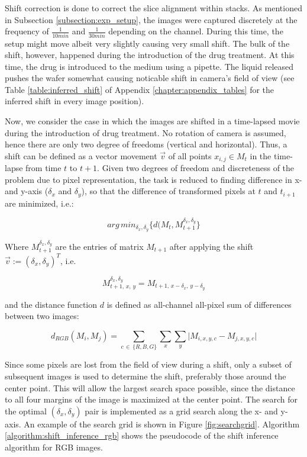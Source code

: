 \documentclass[pdftex,12pt,a4paper]{report}
\begin{document}
Shift correction is done to correct the slice alignment within stacks. As mentioned in Subsection \ref{subsection:exp_setup}, the images were captured discretely at the frequency of $\frac{1}{10 min}$ and $\frac{1}{30 min}$ depending on the channel. During this time, the setup might move albeit very slightly causing very small shift. The bulk of the shift, however, happened during the introduction of the  drug treatment. At this time, the drug is introduced to the medium using a pipette. The liquid released pushes the wafer somewhat causing noticable shift in camera's field of view (see Table \ref{table:inferred_shift} of Appendix \ref{chapter:appendix_tables} for the inferred shift in every image position).

Now, we consider the case in which the images are shifted in a time-lapsed movie during the introduction of drug treatment. No rotation of camera is assumed, hence there are only two degree of freedoms (vertical and horizontal). Thus, a shift can be defined as a vector movement $\vec{v}$ of all points $x_{i,j} \in M_t$ in the time-lapse from time $t$ to $t + 1$. Given two degrees of freedom and discreteness of the problem due to pixel representation, the task is reduced to finding difference in x- and y-axis ($\delta_x$ and $\delta_y$), so that the difference of transformed pixels at $t$ and $t_{i+1}$ are minimized, i.e.:

$$
arg\,min_{\delta_x, \delta_y} \{d(M_{t}, M_{t + 1}^{\delta_x, \delta_y}\}
$$

Where $M_{t + 1}^{\delta_x, \delta_y}$ are the entries of matrix $M_{t + 1}$ after applying the shift $\vec{v} := (\delta_x, \delta_y)^T$, i.e.

$$M_{t + 1, \, x, \, y}^{\delta_x, \delta_y} = M_{t + 1, \, x - \delta_x, \, y - \delta_y}$$

and the distance function $d$ is defined as all-channel all-pixel sum of differences between two images:

$$
d_{RGB}(M_i, M_j) = \sum_{c \, \in \, \{R, B, G\}} \sum_{x} \sum_{y} \vert M_{i, x, y, c} - M_{j, x, y, c} \vert
$$

Since some pixels are lost from the field of view during a shift, only a subset of subsequent images is used to determine the shift, preferably those around the center point. This will allow the largest search space possible, since the distance to all four margins of the image is maximized at the center point. The search for the optimal $(\delta_x, \delta_y)$ pair is implemented as a grid search along the x- and y-axis. An example of the search grid is shown in Figure \ref{fig:searchgrid}. Algorithm \ref{algorithm:shift_inference_rgb} shows the pseudocode of the  shift inference algorithm for RGB images.
\end{document}
